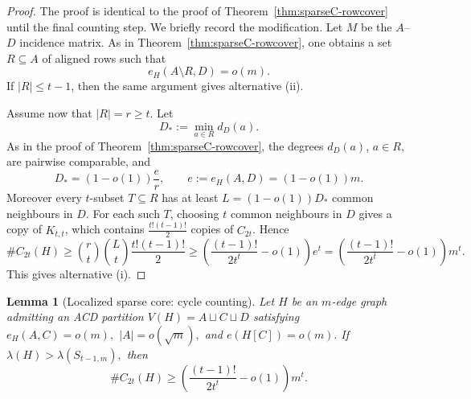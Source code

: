 \documentclass[10pt,a4paper]{amsart}
\newtheorem{lemma}[theorem]{Lemma}
\begin{document}
\begin{proof}
The proof is identical to the proof of
Theorem~\ref{thm:sparseC-rowcover} until the final counting step.  We
briefly record the modification.  Let \(M\) be the \(A\)--\(D\)
incidence matrix.  As in Theorem~\ref{thm:sparseC-rowcover}, one obtains
a set \(R\subseteq A\) of aligned rows such that
\[
        e_H(A\setminus R,D)=o(m).
\]
If \(|R|\le t-1\), then the same argument gives alternative \textup{(ii)}.

Assume now that \(|R|=r\ge t\).  Let
\[
        D_\ast:=\min_{a\in R} d_D(a).
\]
As in the proof of Theorem~\ref{thm:sparseC-rowcover}, the degrees
\(d_D(a)\), \(a\in R\), are pairwise comparable, and
\[
        D_\ast=(1-o(1))\frac{e}{r},
        \qquad
        e:=e_H(A,D)=(1-o(1))m.
\]
Moreover every \(t\)-subset \(T\subseteq R\) has at least $L=(1-o(1))D_\ast$
common neighbours in \(D\).  For each such \(T\), choosing \(t\) common
neighbours in \(D\) gives a copy of \(K_{t,t}\), which contains
$        \frac{t!(t-1)!}{2}$
copies of \(C_{2t}\).  Hence
\[
        \texttt{\#}C_{2t}(H)\ge
        \binom rt\binom Lt\frac{t!(t-1)!}{2}       \ge
        \left(\frac{(t-1)!}{2t^t}-o(1)\right)e^t  =
        \left(\frac{(t-1)!}{2t^t}-o(1)\right)m^t.
\]
This gives alternative \textup{(i)}.
\end{proof}

\begin{lemma}[Localized sparse core: cycle counting]
\label{lem:cycle-localized-sparse}
Let \(H\) be an \(m\)-edge graph admitting an ACD partition
\(V(H)=A\sqcup C\sqcup D\) satisfying $e_H(A,C)=o(m),$ $       |A|=o(\sqrt m),$ and $e(H[C])=o(m).$
If $\lambda(H)>\lambda(S_{t-1,m}),$
then
\[
        \texttt{\#}C_{2t}(H)
        \ge
        \left(\frac{(t-1)!}{2t^t}-o(1)\right)m^t .
\]
\end{lemma}
\end{document}
